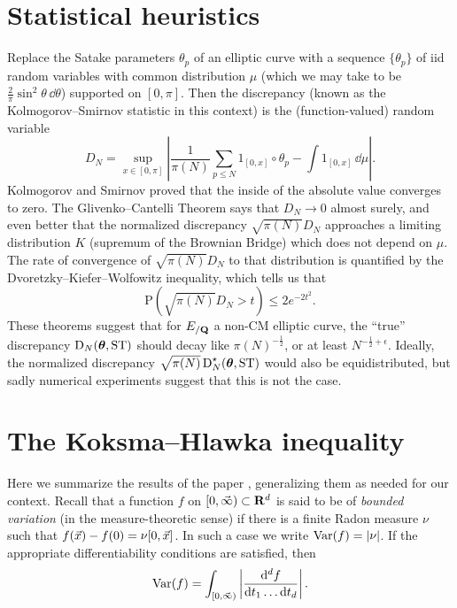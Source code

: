 \section{Statistical heuristics}

Replace the Satake parameters $\theta_p$ of an elliptic curve with 
a sequence $\{\theta_p\}$ of iid random variables with common distribution 
$\mu$ (which we may take to be $\frac{2}{\pi} \sin^2 \theta\, \dd\theta$) 
supported on $[0,\pi]$. Then the discrepancy (known as the 
Kolmogorov--Smirnov statistic in this context) is the (function-valued) 
random variable 
\[
	D_N = \sup_{x\in [0,\pi]} \left|\frac{1}{\pi(N)} \sum_{p\leqslant N} 1_{[0,x]}\circ \theta_p - \int 1_{[0,x]}\, \dd\mu\right| .
\]
Kolmogorov and Smirnov proved that the inside of the absolute value converges 
to zero. The Glivenko--Cantelli Theorem says that $D_N \to 0$ almost surely, 
and even better that the normalized discrepancy $\sqrt{\pi(N)} D_N$ approaches 
a limiting distribution $K$ (supremum of the Brownian Bridge) which does not 
depend on $\mu$. The rate of convergence of $\sqrt{\pi(N)} D_N$ to that 
distribution is quantified by the Dvoretzky--Kiefer--Wolfowitz inequality, 
which tells us that 
\[
	\mathrm{P}\left(\sqrt{\pi(N)} D_N > t\right) \leqslant 2 e^{-2 t^2} .
\]
These theorems suggest that for $E_{/\mathbf{Q}}$ a non-CM elliptic 
curve, the ``true'' discrepancy $\operatorname{D}_N({\boldsymbol\theta},\mathrm{ST})$ should decay 
like $\pi(N)^{-\frac 1 2}$, or at least $N^{-\frac 1 2+\epsilon}$. 
Ideally, the normalized discrepancy $\sqrt{\pi(N)}\operatorname{D}_N^\star({\boldsymbol\theta},\mathrm{ST})$ 
would also be equidistributed, but sadly numerical experiments suggest that 
this is not the case. 





\section{The Koksma--Hlawka inequality}

Here we summarize the results of the paper \cite{okten-1999}, generalizing them 
as needed for our context. Recall that a function $f$ on 
$[0,\vec{\infty})\subset \mathbf{R}^d$ is said to be of \emph{bounded variation} (in the 
measure-theoretic sense) if there is a finite Radon measure $\nu$ such that 
$f(\vec{x}) - f(0) = \nu[0,\vec{x}]$. In such a case we write $\operatorname{Var}(f) = |\nu|$. If 
the appropriate differentiability conditions are satisfied, then 
\[
	\operatorname{Var}(f) = \int_{[0,\vec{\infty})} \left|\frac{\mathrm{d}^d f}{\mathrm{d} t_1 \dots \mathrm{d} t_d} \right|.
\]

